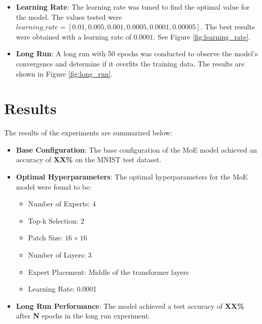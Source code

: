\documentclass[a4paper,11pt]{article}
\begin{document}
\begin{itemize}

    \item \textbf{Learning Rate}: The learning rate was tuned to find the optimal value for the model. The values tested were $learning\_rate = [0.01, 0.005, 0.001, 0.0005, 0.0001, 0.00005]$. The best results were obtained with a learning rate of $0.0001$. See Figure \ref{fig:learning_rate}.


    \item \textbf{Long Run}: A long run with 50 epochs was conducted to observe the model's convergence and determine if it overfits the training data. The results are shown in Figure \ref{fig:long_run}.


\end{itemize}


\section{Results}
The results of the experiments are summarized below:

\begin{itemize}
    \item \textbf{Base Configuration}: The base configuration of the MoE model achieved an accuracy of \textbf{XX\%} on the MNIST test dataset.
    \item \textbf{Optimal Hyperparameters}: The optimal hyperparameters for the MoE model were found to be:
    \begin{itemize}
        \item Number of Experts: 4
        \item Top-k Selection: 2
        \item Patch Size: $16 \times 16$
        \item Number of Layers: 3
        \item Expert Placement: Middle of the transformer layers
        \item Learning Rate: 0.0001
    \end{itemize}
    \item \textbf{Long Run Performance}: The model achieved a test accuracy of \textbf{XX\%} after \textbf{N} epochs in the long run experiment.
\end{itemize}

\end{document}
